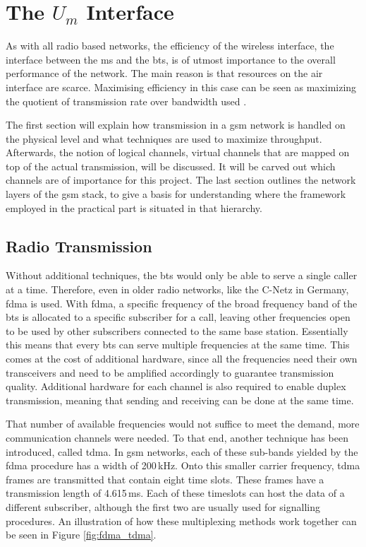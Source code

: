 \section{The $U_m$ Interface}
\label{sec:Um}
As with all radio based networks, the efficiency of the wireless interface, the interface between the \gls{ms} and the \gls{bts}, is of utmost importance to the overall performance of the network.
The main reason is that resources on the air interface are scarce.
Maximising efficiency in this case can be seen as maximizing the quotient of transmission rate over bandwidth used \cite{protocols1999}.

The first section will explain how transmission in a \gls{gsm} network is handled on the physical level and what techniques are used to maximize throughput.
Afterwards, the notion of logical channels, virtual channels that are mapped on top of the actual transmission, will be discussed.
It will be carved out which channels are of importance for this project.
The last section outlines the network layers of the \gls{gsm} stack, to give a basis for understanding where the framework employed in the practical part is situated in that hierarchy.

\subsection{Radio Transmission}
\label{sec:radio}
Without additional techniques, the \gls{bts} would only be able to serve a single caller at a time. 
Therefore, even in older radio networks, like the C-Netz in Germany, \gls{fdma} is used.
With \gls{fdma}, a specific frequency of the broad frequency band of the \gls{bts} is allocated to a specific subscriber for a call, leaving other frequencies open to be used by other subscribers connected to the same base station.
Essentially this means that every \gls{bts} can serve multiple frequencies at the same time.
This comes at the cost of additional hardware, since all the frequencies need their own transceivers and need to be amplified accordingly to guarantee transmission quality.
Additional hardware for each channel is also required to enable duplex transmission, meaning that sending and receiving can be done at the same time.

That number of available frequencies would not suffice to meet the demand, more communication channels were needed.
To that end, another technique has been introduced, called \gls{tdma}.
In \gls{gsm} networks, each of these sub-bands yielded by the \gls{fdma} procedure has a width of 200\,kHz.
Onto this smaller carrier frequency, \gls{tdma} frames are transmitted that contain eight time slots.
These frames have a transmission length of 4.615\,ms.
Each of these timeslots can host the data of a different subscriber, although the first two are usually used for signalling procedures.
An illustration of how these multiplexing methods work together can be seen in Figure \ref{fig:fdma_tdma}.


